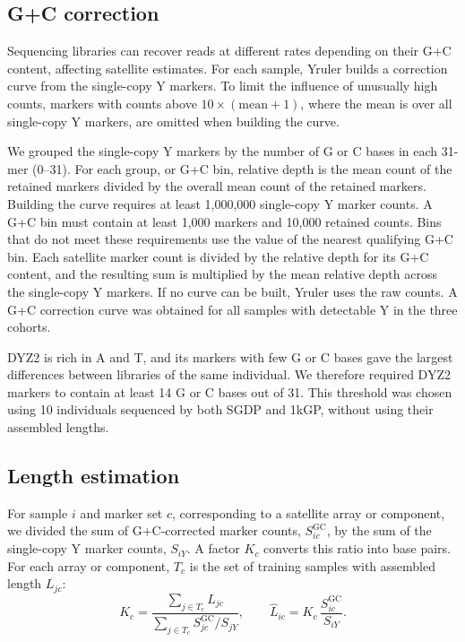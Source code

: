 \subsection{G+C correction}\label{sec:m-gc}
Sequencing libraries can recover reads at different rates depending on their G+C content, affecting satellite estimates. For each sample, Yruler builds a correction curve from the single-copy Y markers. To limit the influence of unusually high counts, markers with counts above $10\times(\mathrm{mean}+1)$, where the mean is over all single-copy Y markers, are omitted when building the curve.

We grouped the single-copy Y markers by the number of G or C bases in each 31-mer (0--31). For each group, or G+C bin, relative depth is the mean count of the retained markers divided by the overall mean count of the retained markers. Building the curve requires at least 1,000,000 single-copy Y marker counts. A G+C bin must contain at least 1,000 markers and 10,000 retained counts. Bins that do not meet these requirements use the value of the nearest qualifying G+C bin. Each satellite marker count is divided by the relative depth for its G+C content, and the resulting sum is multiplied by the mean relative depth across the single-copy Y markers. If no curve can be built, Yruler uses the raw counts. A G+C correction curve was obtained for all samples with detectable Y in the three cohorts.

DYZ2 is rich in A and T, and its markers with few G or C bases gave the largest differences between libraries of the same individual. We therefore required DYZ2 markers to contain at least 14 G or C bases out of 31. This threshold was chosen using 10 individuals sequenced by both SGDP and 1kGP, without using their assembled lengths.

\subsection{Length estimation}\label{sec:m-length}
For sample $i$ and marker set $c$, corresponding to a satellite array or component, we divided the sum of G+C-corrected marker counts, $S^{\mathrm{GC}}_{ic}$, by the sum of the single-copy Y marker counts, $S_{iY}$. A factor $K_c$ converts this ratio into base pairs. For each array or component, $T_c$ is the set of training samples with assembled length $L_{jc}$:
\begin{equation}
 K_c=\frac{\sum_{j\in T_c}L_{jc}}{\sum_{j\in T_c}S^{\mathrm{GC}}_{jc}/S_{jY}},\qquad \widehat L_{ic}=K_c\,\frac{S^{\mathrm{GC}}_{ic}}{S_{iY}}.
\end{equation}

